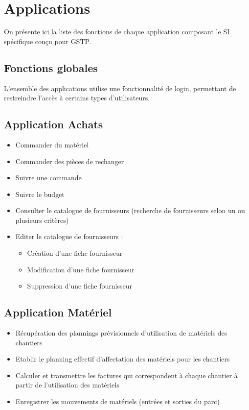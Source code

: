 \documentclass [a4paper] {report}
\begin{document}
\section{Applications}

On présente ici la liste des fonctions de chaque application composant le
SI spécifique conçu pour GSTP.


\subsection{Fonctions globales}

L'ensemble des applications utilise une fonctionnalité de login, permettant
de restreindre l'accès à certains types d'utilisateurs.


\subsection{Application Achats}

\begin{itemize}
\item Commander du matériel
\item Commander des pièces de rechanger
\item Suivre une commande
\item Suivre le budget
\item Consulter le catalogue de fournisseurs (recherche de fournisseurs selon 
un ou plusieurs critères)
\item Editer le catalogue de fournisseurs :
	\begin{itemize}
	\item Création d'une fiche fournisseur
	\item Modification d'une fiche fournisseur
	\item Suppression d'une fiche fournisseur
	\end{itemize}
\end{itemize}

\subsection{Application Matériel}
\begin{itemize}
\item Récupération des plannings prévisionnels d'utilisation de matériels
des chantiers
\item Etablir le planning effectif d'affectation des
matériels pour les chantiers
\item Calculer et transmettre les factures qui correspondent à chaque chantier
à partir de l'utilisation des matériels
\item Enregistrer les mouvements de matériels (entrées et sorties du parc)
\end{itemize}
\end{document}
